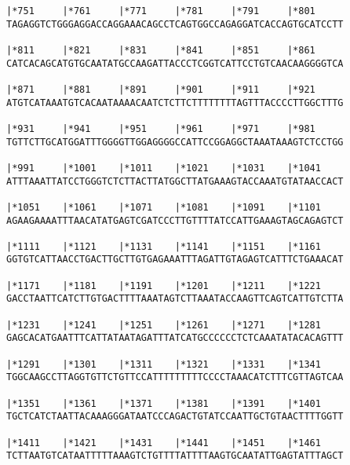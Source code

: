 \documentclass{article}
\begin{document}
\begin{Verbatim}
|*751     |*761     |*771     |*781     |*791     |*801     
TAGAGGTCTGGGAGGACCAGGAAACAGCCTCAGTGGCCAGAGGATCACCAGTGCATCCTT
                                                            
|*811     |*821     |*831     |*841     |*851     |*861     
CATCACAGCATGTGCAATATGCCAAGATTACCCTCGGTCATTCCTGTCAACAAGGGGTCA
                                                            
|*871     |*881     |*891     |*901     |*911     |*921     
ATGTCATAAATGTCACAATAAAACAATCTCTTCTTTTTTTTAGTTTACCCCTTGGCTTTG
                                                            
|*931     |*941     |*951     |*961     |*971     |*981     
TGTTCTTGCATGGATTTGGGGTTGGAGGGGCCATTCCGGAGGCTAAATAAAGTCTCCTGG
                                                            
|*991     |*1001    |*1011    |*1021    |*1031    |*1041    
ATTTAAATTATCCTGGGTCTCTTACTTATGGCTTATGAAAGTACCAAATGTATAACCACT
                                                            
|*1051    |*1061    |*1071    |*1081    |*1091    |*1101    
AGAAGAAAATTTAACATATGAGTCGATCCCTTGTTTTATCCATTGAAAGTAGCAGAGTCT
                                                            
|*1111    |*1121    |*1131    |*1141    |*1151    |*1161    
GGTGTCATTAACCTGACTTGCTTGTGAGAAATTTAGATTGTAGAGTCATTTCTGAAACAT
                                                            
|*1171    |*1181    |*1191    |*1201    |*1211    |*1221    
GACCTAATTCATCTTGTGACTTTTAAATAGTCTTAAATACCAAGTTCAGTCATTGTCTTA
                                                            
|*1231    |*1241    |*1251    |*1261    |*1271    |*1281    
GAGCACATGAATTTCATTATAATAGATTTATCATGCCCCCCTCTCAAATATACACAGTTT
                                                            
|*1291    |*1301    |*1311    |*1321    |*1331    |*1341    
TGGCAAGCCTTAGGTGTTCTGTTCCATTTTTTTTTCCCCTAAACATCTTTCGTTAGTCAA
                                                            
|*1351    |*1361    |*1371    |*1381    |*1391    |*1401    
TGCTCATCTAATTACAAAGGGATAATCCCAGACTGTATCCAATTGCTGTAACTTTTGGTT
                                                            
|*1411    |*1421    |*1431    |*1441    |*1451    |*1461    
TCTTAATGTCATAATTTTTAAAGTCTGTTTTATTTTAAGTGCAATATTGAGTATTTAGCT
                                                            

\end{Verbatim}
\end{document}
